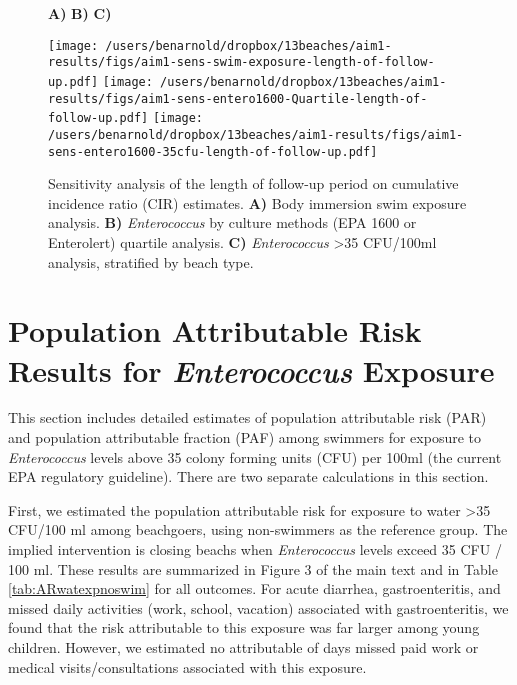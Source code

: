 \documentclass[12pt]{article}\usepackage[]{graphicx}\usepackage[]{color}
\begin{document}
\begin{landscape}
\begin{figure}[htbp]
{\large \hspace{1cm} \textbf{A)} \hspace{7cm} \textbf{B)}    \hspace{7cm} \textbf{C)} }\\

\begin{center}
 \texttt{[image: /users/benarnold/dropbox/13beaches/aim1-results/figs/aim1-sens-swim-exposure-length-of-follow-up.pdf]} 
 \texttt{[image: /users/benarnold/dropbox/13beaches/aim1-results/figs/aim1-sens-entero1600-Quartile-length-of-follow-up.pdf]} 
  \texttt{[image: /users/benarnold/dropbox/13beaches/aim1-results/figs/aim1-sens-entero1600-35cfu-length-of-follow-up.pdf]} 

\begin{minipage}{1.2\textwidth}

\caption{Sensitivity analysis of the length of follow-up period on cumulative incidence ratio (CIR) estimates. \textbf{A)} Body immersion swim exposure analysis. \textbf{B)} \textit{Enterococcus} by culture methods (EPA 1600 or Enterolert) quartile analysis. \textbf{C)} \textit{Enterococcus} >35 CFU/100ml analysis, stratified by beach type. \label{fig:fulengthsens} }
\end{minipage}
\end{center}
\end{figure}
\end{landscape}

\clearpage
\setcounter{table}{0}
\setcounter{figure}{0}
\section{Population Attributable Risk Results for \textit{Enterococcus} Exposure}

This section includes detailed estimates of population attributable risk (PAR) and population attributable fraction (PAF) among swimmers for exposure to \textit{Enterococcus} levels above 35 colony forming units (CFU) per 100ml (the current EPA regulatory guideline). There are two separate calculations in this section. 

First, we estimated the population attributable risk for exposure to water >35 CFU/100 ml among beachgoers, using non-swimmers as the reference group. The implied intervention is closing beachs when \textit{Enterococcus} levels exceed 35 CFU / 100 ml.  These results are summarized in Figure 3 of the main text and in Table \ref{tab:ARwatexpnoswim} for all outcomes. For acute diarrhea, gastroenteritis, and missed daily activities (work, school, vacation) associated with gastroenteritis, we found that the risk attributable to this exposure was far larger among young children. However, we estimated no attributable of days missed paid work or medical visits/consultations associated with this exposure.
\end{document}
